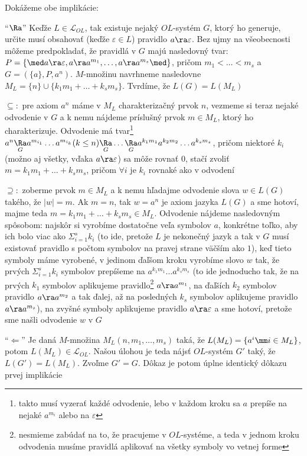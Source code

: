 \begin{dokaz}
Dokážeme obe implikácie:
\begin{description}
\item{``$\Ra$''} Keďže $L\in\mathcal{L}_{OL}$, tak existuje nejaký
$OL$-systém $G$, ktorý ho generuje, určite musí obsahovať (keďže
$\varepsilon\in L$) pravidlo $a\ra\varepsilon$. Bez ujmy na
všeobecnosti môžeme predpokladať, že pravidlá v $G$ majú
nasledovný tvar: $P=\{\med a\ra\varepsilon,a\ra
a^{m_{1}},\dots,a\ra a^{m_{s}}\med\}$, pričom $m_{1}<\dots<m_{s}$
a $G=(\{a\},P,a^{n})$. $M$-množinu navrhneme nasledovne
$M_{L}=\{n\}\cup\{k_{1}m_{1}+\dots+k_{s}m_{s}\}$. Tvrdíme, že
$L(G)=L(M_{L})$
\begin{description}
\item{$\subseteq:$} pre axiom $a^{n}$ máme v $M_{L}$
charakterizačný prvok $n$, vezmeme si teraz nejaké odvodenie v $G$
a k nemu nájdeme príslušný prvok $m\in M_{L}$, ktorý ho
charakterizuje. Odvodenie má tvar\footnote{takto musí vyzerať
každé odvodenie, lebo v každom kroku sa $a$ prepíše na nejaké
$a^{m_{i}}$ alebo na $\varepsilon$} $a^{n}\underset{G}\Ra
a^{m_{i_{1}}}\dots a^{m_{i_{k}}}(k\leq
n)\underset{G}\Ra\dots\underset{G}\Ra
a^{k_{1}m_{1}}a^{k_{2}m_{2}}\dots a^{k_{s}m_{s}}$, pričom niektoré
$k_{i}$ (možno aj všetky, vďaka $a\ra\varepsilon$) sa môže rovnať
$0$, stačí zvoliť $m=k_{1}m_{1}+\dots+k_{s}m_{s}$, pričom $\forall
i$ je $k_{i}$ rovnaké ako v odvodení
\item{$\supseteq:$} zoberme prvok $m\in M_{L}$ a k nemu hľadajme
odvodenie slova $w\in L(G)$ takého, že $|w|=m$. Ak $m=n$, tak
$w=a^{n}$ je axiom jazyka $L(G)$ a sme hotoví, majme teda
$m=k_{1}m_{1}+\dots+k_{s}m_{s}\in M_{L}$. Odvodenie nájdeme
nasledovným spôsobom: najskôr si vyrobíme dostatočne veľa symbolov
$a$, konkrétne  toľko, aby ich bolo viac ako
$\Sigma_{i=1}^{s}k_{i}$ (to ide, pretože $L$ je nekonečný jazyk a
tak v $G$ musí existovať pravidlo s počtom symbolov na pravej
strane väčším ako $1$), keď tieto symboly máme vyrobené, v jedinom
ďaľšom kroku vyrobíme slovo $w$ tak, že prvých
$\Sigma_{i=1}^{s}k_{i}$ symbolov prepíšeme na $a^{k_{1}m_{1}}\dots
a^{k_{s}m_{s}}$ (to ide jednoducho tak, že na prvých $k_{1}$
symbolov aplikujeme pravidlo\footnote{nesmieme zabúdať na to, že
pracujeme v $OL$-systéme, a teda v jednom kroku odvodenia musíme
pravidlá aplikovať na všetky symboly vo vetnej forme} $a\ra
a^{m_{1}}$, na ďaľších $k_{2}$ symbolov pravidlo $a\ra a^{m_{2}}$
a tak ďalej, až na posledných $k_{s}$ symbolov aplikujeme pravidlo
$a\ra a^{m_{s}}$), na zvyšné symboly aplikujeme pravidlo
$a\ra\varepsilon$ a sme hotoví, pretože sme našli odvodenie $w$ v
$G$
\end{description}
\item{``$\Leftarrow$''} Je daná $M$-množina
$M_{L}(n,m_{1},\dots,m_{s})$ taká, že $L(M_{L})=\{a^{i}\mm i\in
M_{L}\}$, potom $L(M_{L})\in\mathcal{L}_{OL}$. Našou úlohou je
teda nájsť $OL$-systém $G'$ taký, že $L(G')=L(M_{L})$. Zvoľme
$G'=G$. Dôkaz je potom úplne identický dôkazu prvej implikácie
\end{description}
\end{dokaz}

